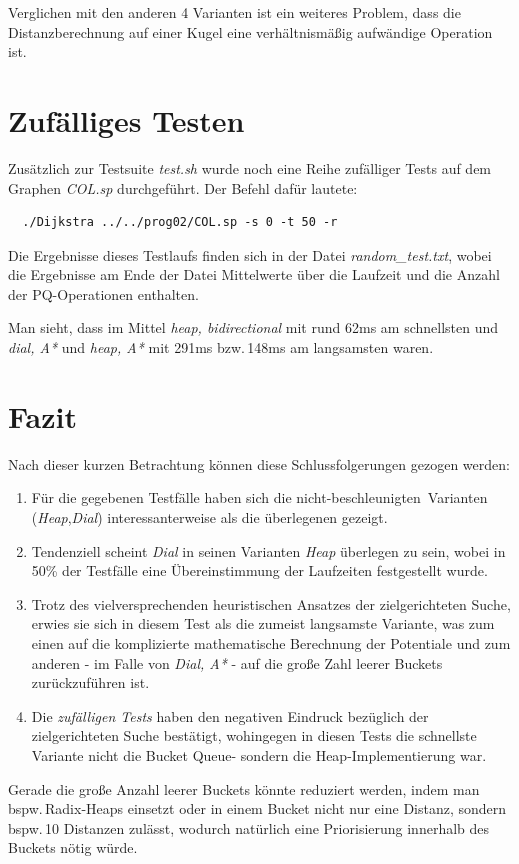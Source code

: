 \documentclass{scrartcl}
\begin{document}
Verglichen mit den anderen 4 Varianten ist ein weiteres Problem, dass die 
Distanzberechnung auf einer Kugel eine verhältnismäßig aufwändige Operation 
ist.

\section{Zufälliges Testen}

Zusätzlich zur Testsuite \emph{test.sh} wurde noch eine Reihe zufälliger
Tests auf dem Graphen \emph{COL.sp} durchgeführt.
Der Befehl dafür lautete:
\begin{verbatim}
  ./Dijkstra ../../prog02/COL.sp -s 0 -t 50 -r
\end{verbatim}
Die Ergebnisse dieses Testlaufs finden sich in der Datei \emph{random\_test.txt},
wobei die Ergebnisse am Ende der Datei Mittelwerte über die Laufzeit und
die Anzahl der PQ-Operationen enthalten.

Man sieht, dass im Mittel \emph{heap, bidirectional} mit rund 62ms am 
schnellsten und \emph{dial, A*} und \emph{heap, A*} mit 291ms bzw.\,148ms am
langsamsten waren.

\section{Fazit}

Nach dieser kurzen Betrachtung können diese Schlussfolgerungen gezogen werden:
\begin{enumerate}
  \item Für die gegebenen Testfälle haben sich die 
        \glqq nicht-beschleunigten\grqq\ Varianten 
        (\emph{Heap},\emph{Dial}) interessanterweise als die überlegenen
        gezeigt.
  \item Tendenziell scheint \emph{Dial} in seinen Varianten \emph{Heap}
        überlegen zu sein, wobei in 50\% der Testfälle eine Übereinstimmung der
        Laufzeiten festgestellt wurde.
  \item Trotz des vielversprechenden heuristischen Ansatzes der zielgerichteten
        Suche, erwies sie sich in diesem Test als die zumeist langsamste 
        Variante, was zum einen auf die komplizierte mathematische Berechnung
        der Potentiale und zum anderen - im Falle von \emph{Dial, A*} - 
        auf die große Zahl leerer Buckets zurückzuführen ist.
  \item Die \emph{zufälligen Tests} haben den negativen Eindruck bezüglich der
        zielgerichteten Suche bestätigt, wohingegen in diesen Tests die 
        schnellste Variante nicht die Bucket Queue- sondern die 
        Heap-Implementierung war.
\end{enumerate}

Gerade die große Anzahl leerer Buckets könnte reduziert werden, indem man
bspw.\,Radix-Heaps einsetzt oder in einem Bucket nicht nur eine Distanz,
sondern bspw.\,10 Distanzen zulässt, wodurch natürlich eine Priorisierung 
innerhalb des Buckets nötig würde.
\end{document}
